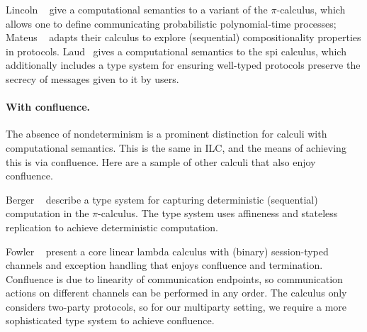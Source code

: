 
Lincoln \etal~\cite{lincoln1998probabilistic} give a computational semantics to
a variant of the $\pi$-calculus, which allows one to define communicating
probabilistic polynomial-time processes; Mateus
\etal~\cite{mateus2003composition} adapts their calculus to explore (sequential)
compositionality properties in protocols.  Laud~\cite{laud2005secrecy} gives a
computational semantics to the spi calculus, which additionally includes a type
system for ensuring well-typed protocols preserve the secrecy of messages given
to it by users.


\paragraph{With confluence.} The absence of nondeterminism is a prominent distinction for calculi with
computational semantics. This is the same in ILC, and the means of achieving
this is via confluence. Here are a sample of other calculi that also enjoy
confluence.

Berger \etal~\cite{berger2001sequentiality} describe a type system for capturing
deterministic (sequential) computation in the $\pi$-calculus. The type system uses
affineness and stateless replication to achieve deterministic computation.

Fowler \etal~\cite{fowler2018session} present a core linear lambda calculus with
(binary) session-typed channels and exception handling that enjoys confluence
and termination. Confluence is due to linearity of communication endpoints, so
communication actions on different channels can be performed in any order. The
calculus only considers two-party protocols, so for our multiparty setting, we
require a more sophisticated type system to achieve confluence.

